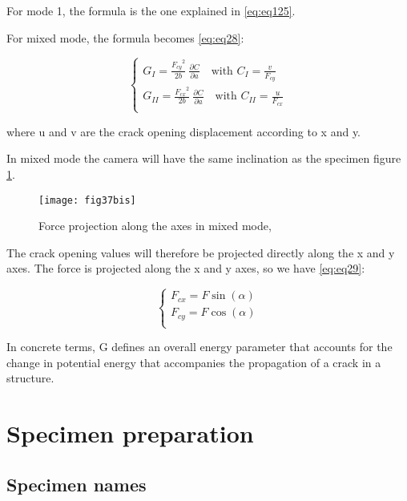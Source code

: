 For mode 1, the formula is the one explained in \ref{eq:eq125}.

For mixed mode, the formula becomes \ref{eq:eq28}:

\begin{equation}
	\begin{cases}
		G_I=\frac{{F_{cy}}^2}{2b}\ \frac{\partial C}{\partial a} \quad \text{with } C_I=\frac{v}{F_{cy}} \\
		G_{II}=\frac{{F_{cx}}^2}{2b}\ \frac{\partial C}{\partial a} \quad \text{with } C_{II}=\frac{u}{F_{cx}}\\ 
	\end{cases}
\label{eq:eq28}
\end{equation}

where u and v are the crack opening displacement according to x and y.

In mixed mode the camera will have the same inclination as the specimen figure \ref{fig:fig37bis}.

\begin{figure}[htp]
	\centering
	\texttt{[image: fig37bis]}
	\caption{Force projection along the axes in mixed mode, \cite{Odounga2018phd}}
	\label{fig:fig37bis}
\end{figure}

The crack opening values will therefore be projected directly along the x and y axes. The force is projected along the x and y axes, so we have \ref{eq:eq29}:


\begin{equation}
	\begin{cases}
		F_{cx}=F \sin(\alpha) \\
		F_{cy}=F \cos(\alpha) \\ 
	\end{cases}
	\label{eq:eq29}
\end{equation}

In concrete terms, G defines an overall energy parameter that accounts for the change in potential energy that accompanies the propagation of a crack in a structure.

\section{Specimen preparation}

\subsection{Specimen names}

